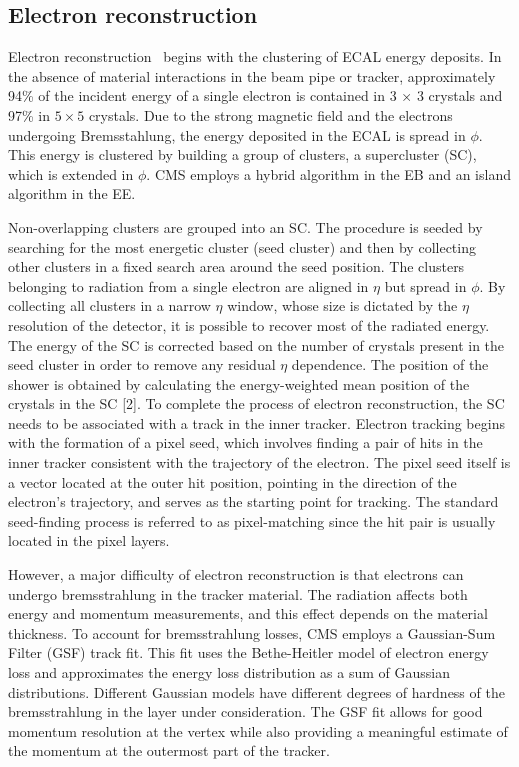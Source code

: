 \subsection{Electron reconstruction}
Electron reconstruction~\cite{Khachatryan:2015hwa} begins with the clustering of ECAL energy deposits. In the absence of material interactions in the beam pipe or tracker, approximately 94\% of the incident energy of a single electron is contained in 3 × 3 crystals and 97\% in $5\times 5$ crystals. Due to the strong magnetic field and the electrons undergoing Bremsstahlung, the energy deposited in the ECAL is spread in $\phi$. This energy is clustered by building a group of clusters, a supercluster (SC), which is extended in $\phi$. CMS employs a hybrid algorithm in the EB and an island algorithm in the EE.

Non-overlapping clusters are grouped into an SC. The procedure is seeded by searching for the most energetic cluster (seed cluster) and then by collecting other clusters in a fixed search area around the seed position. The clusters belonging to radiation from a single electron are aligned in $\eta$ but spread in $\phi$. By collecting all clusters in a narrow $\eta$ window, whose size is dictated by the $\eta$ resolution of the detector, it is possible to recover most of the radiated energy. The energy of the SC is corrected based on the number of crystals present in the seed cluster in order to remove any residual $\eta$ dependence. The position of the shower is obtained by calculating the energy-weighted mean position of the crystals in the SC [2]. To complete the process of electron reconstruction, the SC needs to be associated with a track in the inner tracker. Electron tracking begins with the formation of a pixel seed, which involves finding a pair of hits in the inner tracker consistent with the trajectory of the electron. The pixel seed itself is a vector located at the outer hit position, pointing in the direction of the electron’s trajectory, and serves as the starting point for tracking. The standard seed-finding process is referred to as pixel-matching since the hit pair is usually located in the pixel layers.

However, a major difficulty of electron reconstruction is that electrons can undergo bremsstrahlung in the tracker material. The radiation affects both energy and momentum measurements, and this effect depends on the material thickness. To account for bremsstrahlung losses, CMS employs a Gaussian-Sum Filter (GSF) track fit. This fit uses the Bethe-Heitler model of electron energy loss and approximates the energy loss distribution as a sum of Gaussian distributions. Different Gaussian models have different degrees of hardness of the bremsstrahlung in the layer under consideration. The GSF fit allows for good momentum resolution at the vertex while also providing a meaningful estimate of the momentum at the outermost part of the tracker.

